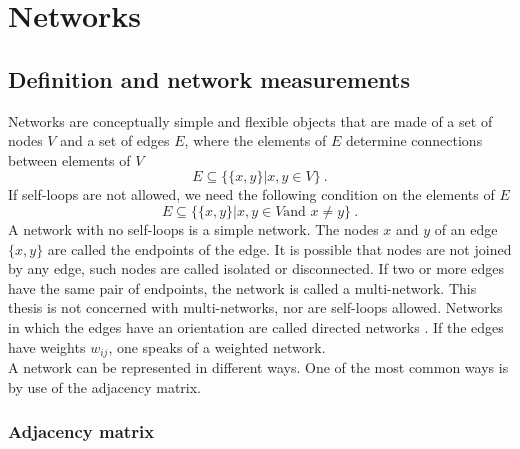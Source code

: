 \documentclass[11 pt , letterpaper , twoside , openright]{book}
\begin{document}
\chapter{Networks}
\label{chap2}

\section{Definition and network measurements}
\label{netDef}

Networks are conceptually simple and flexible objects that are made of a set of nodes $V$ and a set of edges $E$, where the elements of $E$ determine connections between elements of $V$ \cite{Costa2018}
\begin{equation}
	E \subseteq \{\{x, y\}| x, y \in V \}\ .
\end{equation}
If self-loops are not allowed, we need the following condition on the elements of $E$
\begin{equation}
	E \subseteq \{\{x, y\}| x, y \in V \text{and\ } x \neq y \} \ .
\end{equation}
A network with no self-loops is a simple network. The nodes $x$ and $y$ of an edge $\{x, y\}$ are called the endpoints of the edge. It is possible that nodes are not joined by any edge, such nodes are called isolated or disconnected. If two or more edges have the same pair of endpoints, the network is called a multi-network. This thesis is not concerned with multi-networks, nor are self-loops allowed. Networks in which the edges have an orientation are called directed networks \cite{Costa2018}. If the edges have weights $w_{ij}$, one speaks of a weighted network.\\
\newline
A network can be represented in different ways. One of the most common ways is by use of the adjacency matrix.

\subsection{Adjacency matrix}
\end{document}
